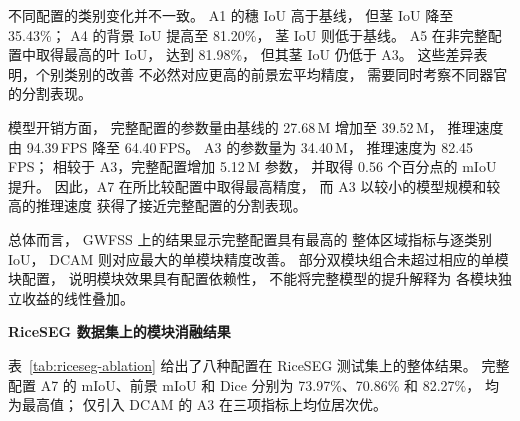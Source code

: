 不同配置的类别变化并不一致。
A1 的穗 IoU 高于基线，
但茎 IoU 降至 35.43\%；
A4 的背景 IoU 提高至 81.20\%，
茎 IoU 则低于基线。
A5 在非完整配置中取得最高的叶 IoU，
达到 81.98\%，
但其茎 IoU 仍低于 A3。
这些差异表明，个别类别的改善
不必然对应更高的前景宏平均精度，
需要同时考察不同器官的分割表现。

模型开销方面，
完整配置的参数量由基线的 27.68\,M
增加至 39.52\,M，
推理速度由 94.39\,FPS 降至 64.40\,FPS。
A3 的参数量为 34.40\,M，
推理速度为 82.45\,FPS；
相较于 A3，完整配置增加 5.12\,M 参数，
并取得 0.56 个百分点的 mIoU 提升。
因此，A7 在所比较配置中取得最高精度，
而 A3 以较小的模型规模和较高的推理速度
获得了接近完整配置的分割表现。

总体而言，
GWFSS 上的结果显示完整配置具有最高的
整体区域指标与逐类别 IoU，
DCAM 则对应最大的单模块精度改善。
部分双模块组合未超过相应的单模块配置，
说明模块效果具有配置依赖性，
不能将完整模型的提升解释为
各模块独立收益的线性叠加。

\medskip\noindent\textbf{RiceSEG 数据集上的模块消融结果}\par
\label{sec:exp-ablation-riceseg}

表~\ref{tab:riceseg-ablation}
给出了八种配置在 RiceSEG 测试集上的整体结果。
完整配置 A7 的 mIoU、前景 mIoU 和 Dice
分别为 73.97\%、70.86\% 和 82.27\%，
均为最高值；
仅引入 DCAM 的 A3 在三项指标上均位居次优。

